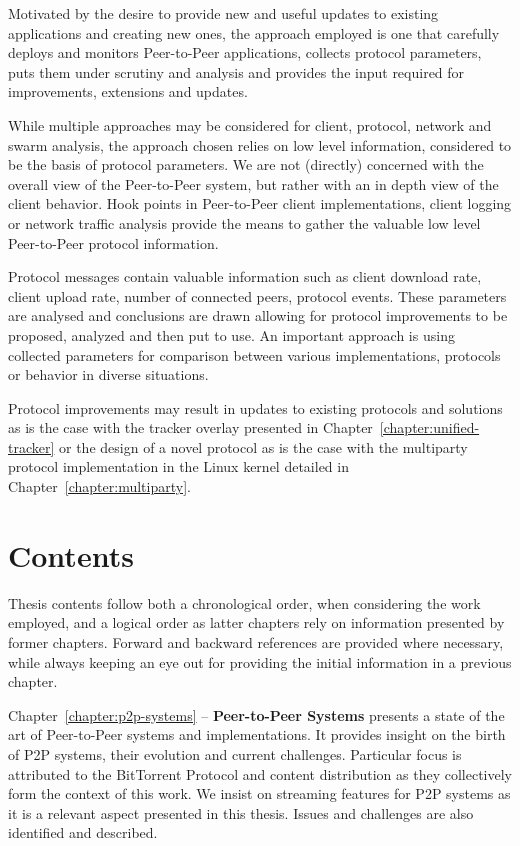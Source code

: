 Motivated by the desire to provide new and useful updates to existing
applications and creating new ones, the approach employed is one that
carefully deploys and monitors Peer-to-Peer applications, collects protocol
parameters, puts them under scrutiny and analysis and provides the input
required for improvements, extensions and updates.

While multiple approaches may be considered for client, protocol, network and
swarm analysis, the approach chosen relies on low level information,
considered to be the basis of protocol parameters. We are not (directly)
concerned with the overall view of the Peer-to-Peer system, but rather with an
in depth view of the client behavior. Hook points in Peer-to-Peer client
implementations, client logging or network traffic analysis provide the means
to gather the valuable low level Peer-to-Peer protocol information.

Protocol messages contain valuable information such as client download rate,
client upload rate, number of connected peers, protocol events. These
parameters are analysed and conclusions are drawn allowing for protocol
improvements to be proposed, analyzed and then put to use. An important
approach is using collected parameters for comparison between various
implementations, protocols or behavior in diverse situations.

Protocol improvements may result in updates to existing protocols and
solutions as is the case with the tracker overlay presented in
Chapter~\ref{chapter:unified-tracker} or the design of a novel protocol as is
the case with the multiparty protocol implementation in the Linux kernel
detailed in Chapter~\ref{chapter:multiparty}.

\section{Contents}
\label{sec:intro:contents}

Thesis contents follow both a chronological order, when considering the work
employed, and a logical order as latter chapters rely on information presented
by former chapters. Forward and backward references are provided where
necessary, while always keeping an eye out for providing the initial
information in a previous chapter.

Chapter~\ref{chapter:p2p-systems} -- \textbf{Peer-to-Peer Systems} presents a
state of the art of Peer-to-Peer systems and implementations. It provides
insight on the birth of P2P systems, their evolution and current challenges.
Particular focus is attributed to the BitTorrent Protocol and content
distribution as they collectively form the context of this work. We insist on
streaming features for P2P systems as it is a relevant aspect presented in
this thesis. Issues and challenges are also identified and described.

